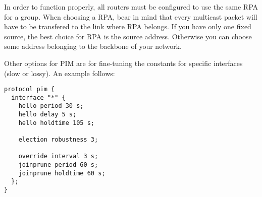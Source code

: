 In order to function properly, all routers must be configured to use the same
RPA for a group. When choosing a RPA, bear in mind that every multicast packet
will have to be transfered to the link where RPA belongs. If you have only one
fixed source, the best choice for RPA is the source address. Otherwise you can
choose some address belonging to the backbone of your network.

Other options for PIM are for fine-tuning the constants for specific
interfaces (slow or lossy). An example follows:

\begin{lstlisting}
protocol pim {
  interface "*" {
    hello period 30 s;
    hello delay 5 s;
    hello holdtime 105 s;

    election robustness 3;

    override interval 3 s;
    joinprune period 60 s;
    joinprune holdtime 60 s;
  };
}
\end{lstlisting}

